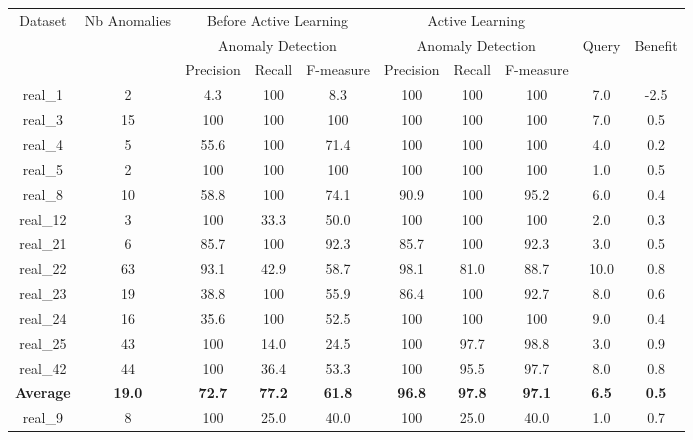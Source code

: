 \begin{table*}[h]
	\centering
	\setlength\tabcolsep{1.5pt}
	\begin{tabular}{|c|c|c|c|c|c|c|c|c|c|}
		\toprule
		\multirow{3}[6]{*}{Dataset} & \multirow{3}[6]{*}{Nb Anomalies} & \multicolumn{3}{c|}{Before Active Learning } & \multicolumn{3}{c|}{Active Learning } &       &  \\
		\cmidrule{3-10}          &       & \multicolumn{3}{c|}{Anomaly Detection} & \multicolumn{3}{c|}{Anomaly Detection} & \multirow{2}[4]{*}{Query} & \multirow{2}[4]{*}{Benefit} \\
		\cmidrule{3-8}          &       & Precision & Recall  & F-measure & Precision & Recall  & F-measure &       &  \\
		\midrule
		real\_1 & 2     & 4.3   & 100 & 8.3   & 100 & 100 & 100 & 7.0   & -2.5 \\
		\midrule
		real\_3 & 15    & 100 & 100 & 100 & 100 & 100 & 100 & 7.0   & 0.5 \\
		\midrule
		real\_4 & 5     & 55.6  & 100 & 71.4  & 100 & 100 & 100 & 4.0   & 0.2 \\
		\midrule
		real\_5 & 2     & 100 & 100 & 100 & 100 & 100 & 100 & 1.0   & 0.5 \\
		\midrule
		real\_8 & 10    & 58.8  & 100 & 74.1  & 90.9  & 100 & 95.2  & 6.0   & 0.4 \\
		\midrule
		real\_12 & 3     & 100 & 33.3  & 50.0  & 100 & 100 & 100 & 2.0   & 0.3 \\
		\midrule
		real\_21 & 6     & 85.7  & 100 & 92.3  & 85.7  & 100 & 92.3  & 3.0   & 0.5 \\
		\midrule
		real\_22 & 63    & 93.1  & 42.9  & 58.7  & 98.1  & 81.0  & 88.7  & 10.0  & 0.8 \\
		\midrule
		real\_23 & 19    & 38.8  & 100 & 55.9  & 86.4  & 100 & 92.7  & 8.0   & 0.6 \\
		\midrule
		real\_24 & 16    & 35.6  & 100 & 52.5  & 100 & 100 & 100 & 9.0   & 0.4 \\
		\midrule
		real\_25 & 43    & 100 & 14.0  & 24.5  & 100 & 97.7  & 98.8  & 3.0   & 0.9 \\
		\midrule
		real\_42 & 44    & 100 & 36.4  & 53.3  & 100 & 95.5  & 97.7  & 8.0   & 0.8 \\
		\midrule
		\rowcolor[rgb]{ 1,  1,  0} \textbf{Average} & \textbf{19.0} & \textbf{72.7} & \textbf{77.2} & \textbf{61.8} & \textbf{96.8} & \textbf{97.8} & \textbf{97.1} & \textbf{6.5} & \textbf{0.5} \\
		\midrule
		real\_9 & 8     & 100 & 25.0  & 40.0  & 100 & 25.0  & 40.0  & 1.0   & 0.7 \\

\end{tabular}
\end{table*}
